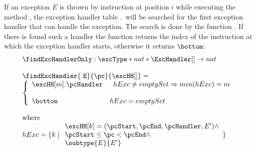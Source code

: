  If an exception $E$ is thrown by instruction at position $i$ while executing the method \methodd,
 the exception handler table  \methodd.\excHandlerTable \ will be searched for the first exception handler that can handle the exception. 
 The search is done by the function \findExcHandlerOnly. If there is found
 such a handler the function returns the index of the instruction at which the exception handler starts, otherwise it returns $\bottom$:
 $$ \begin{array}{l}
        \findExcHandlerOnly : \excType * nat * \ExcHandler[] \rightarrow nat \\
	\\
	\findExcHandler{ \mbox{ \rm \texttt{E}} }{\pc}{\excHH[]} = \\
	 \left\{\begin{array}{ll}
	     \excHH[m].\pcHandler & \begin{array}{l}
	          		          hExc \neq emptySet \Rightarrow
					  min( hExc ) = m
			            \end{array}	 \\
			   & \\
	     \bottom &  hExc = emptySet
	 \end{array}\right. \\
\\ 
 \rm{where } \\  
  hExc = \{ k  \mid  \begin{array}{l} 
                        \excHH[k] = (\pcStart,\pcEnd,\pcHandler, E' ) \wedge  \\
                        \pcStart \leq \pc < \pcEnd \wedge \\
			 \subtype{E}{E'} 
                    \end{array} \}
   \end{array}	  
 $$
